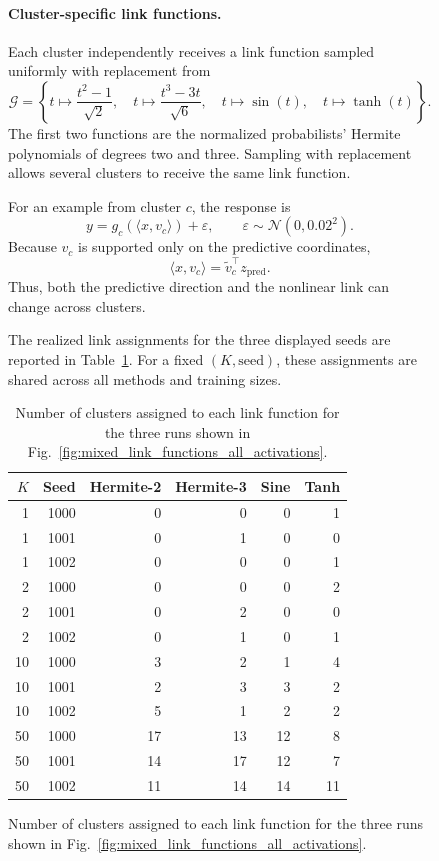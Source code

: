 \documentclass{article}
\begin{document}
\begin{figure}
\paragraph{Cluster-specific link functions.}
Each cluster independently receives a link function sampled uniformly with
replacement from
\begin{equation}
    \mathcal G
    =
    \left\{
        t\mapsto\frac{t^2-1}{\sqrt{2}},
        \quad
        t\mapsto\frac{t^3-3t}{\sqrt{6}},
        \quad
        t\mapsto\sin(t),
        \quad
        t\mapsto\tanh(t)
    \right\}.
    \label{eq:local-link-function-family}
\end{equation}
The first two functions are the normalized probabilists' Hermite polynomials
of degrees two and three. Sampling with replacement allows several clusters
to receive the same link function.

For an example from cluster \(c\), the response is
\begin{equation}
    y
    =
    g_c\!\left(\langle x,v_c\rangle\right)+\varepsilon,
    \qquad
    \varepsilon\sim\mathcal N(0,0.02^2).
    \label{eq:local-routing-mixed-target}
\end{equation}
Because \(v_c\) is supported only on the predictive coordinates,
\[
    \langle x,v_c\rangle
    =
    \widetilde v_c^\top z_{\mathrm{pred}}.
\]
Thus, both the predictive direction and the nonlinear link can change across
clusters.

The realized link assignments for the three displayed seeds are reported in
Table~\ref{tab:link-function-counts}. For a fixed \((K,\text{seed})\), these
assignments are shared across all methods and training sizes.

\begin{table}[t]
\centering
\small
\caption{Number of clusters assigned to each link function for the three
runs shown in Fig.~\ref{fig:mixed_link_functions_all_activations}.}
\label{tab:link-function-counts}
\begin{tabular}{@{}rrrrrr@{}}
\toprule
\(K\) & Seed & Hermite-2 & Hermite-3 & Sine & Tanh\\
\midrule
1  & 1000 & 0  & 0  & 0  & 1\\
1  & 1001 & 0  & 1  & 0  & 0\\
1  & 1002 & 0  & 0  & 0  & 1\\
\midrule
2  & 1000 & 0  & 0  & 0  & 2\\
2  & 1001 & 0  & 2  & 0  & 0\\
2  & 1002 & 0  & 1  & 0  & 1\\
\midrule
10 & 1000 & 3  & 2  & 1  & 4\\
10 & 1001 & 2  & 3  & 3  & 2\\
10 & 1002 & 5  & 1  & 2  & 2\\
\midrule
50 & 1000 & 17 & 13 & 12 & 8\\
50 & 1001 & 14 & 17 & 12 & 7\\
50 & 1002 & 11 & 14 & 14 & 11\\
\bottomrule
\end{tabular}
\end{table}



\end{figure}
\end{document}
